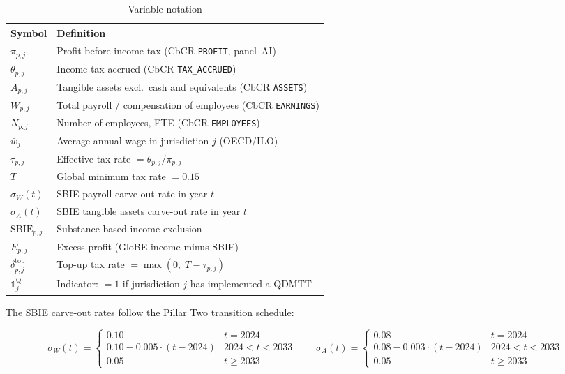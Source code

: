 \documentclass[11pt,a4paper]{article}
\newcommand{\code}[1]{\texttt{#1}}
\begin{document}
\begin{table}[H]
\centering
\caption{Variable notation}
\label{tab:notation}
\small
\begin{tabular}{@{}ll@{}}
\toprule
Symbol & Definition \\
\midrule
$\pi_{p,j}$ & Profit before income tax (CbCR \code{PROFIT}, panel~AI) \\
$\theta_{p,j}$ & Income tax accrued (CbCR \code{TAX\_ACCRUED}) \\
$A_{p,j}$ & Tangible assets excl.\ cash and equivalents (CbCR \code{ASSETS}) \\
$W_{p,j}$ & Total payroll / compensation of employees (CbCR \code{EARNINGS}) \\
$N_{p,j}$ & Number of employees, FTE (CbCR \code{EMPLOYEES}) \\
$\bar{w}_j$ & Average annual wage in jurisdiction $j$ (OECD/ILO) \\
$\tau_{p,j}$ & Effective tax rate $= \theta_{p,j} / \pi_{p,j}$ \\
$T$ & Global minimum tax rate $= 0.15$ \\
$\sigma_W(t)$ & SBIE payroll carve-out rate in year $t$ \\
$\sigma_A(t)$ & SBIE tangible assets carve-out rate in year $t$ \\
$\text{SBIE}_{p,j}$ & Substance-based income exclusion \\
$E_{p,j}$ & Excess profit (GloBE income minus SBIE) \\
$\delta_{p,j}^{\text{top}}$ & Top-up tax rate $= \max(0,\; T - \tau_{p,j})$ \\
$\mathbb{1}_j^{\text{Q}}$ & Indicator: $=1$ if jurisdiction $j$ has implemented a QDMTT \\
\bottomrule
\end{tabular}
\end{table}

The SBIE carve-out rates follow the Pillar Two transition schedule:

\begin{equation}\label{eq:sbie_rates}
\sigma_W(t) = \begin{cases} 0.10 & t = 2024 \\ 0.10 - 0.005 \cdot (t - 2024) & 2024 < t < 2033 \\ 0.05 & t \geq 2033 \end{cases}
\quad\quad
\sigma_A(t) = \begin{cases} 0.08 & t = 2024 \\ 0.08 - 0.003 \cdot (t - 2024) & 2024 < t < 2033 \\ 0.05 & t \geq 2033 \end{cases}
\end{equation}
\end{document}
